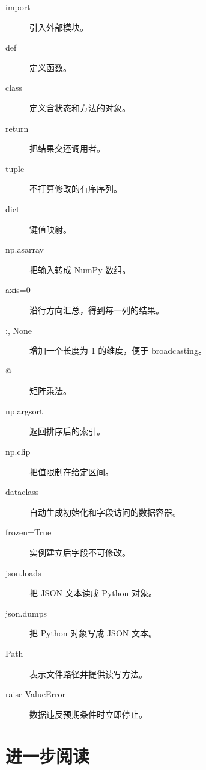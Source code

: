 \documentclass[UTF8,11pt,openany,fontset=none]{ctexbook}
\begin{document}
\begin{description}
\item[import] 引入外部模块。
\item[def] 定义函数。
\item[class] 定义含状态和方法的对象。
\item[return] 把结果交还调用者。
\item[tuple] 不打算修改的有序序列。
\item[dict] 键值映射。
\item[np.asarray] 把输入转成 NumPy 数组。
\item[axis=0] 沿行方向汇总，得到每一列的结果。
\item[:, None] 增加一个长度为 1 的维度，便于 broadcasting。
\item[@] 矩阵乘法。
\item[np.argsort] 返回排序后的索引。
\item[np.clip] 把值限制在给定区间。
\item[dataclass] 自动生成初始化和字段访问的数据容器。
\item[frozen=True] 实例建立后字段不可修改。
\item[json.loads] 把 JSON 文本读成 Python 对象。
\item[json.dumps] 把 Python 对象写成 JSON 文本。
\item[Path] 表示文件路径并提供读写方法。
\item[raise ValueError] 数据违反预期条件时立即停止。
\end{description}

\chapter{进一步阅读}
\end{document}
